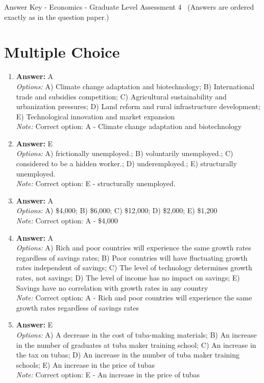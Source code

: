 \documentclass[12pt]{article}
\begin{document}
\begin{center}
Answer Key - Economics - Graduate Level Assessment 4 \
\small (Answers are ordered exactly as in the question paper.)
\end{center}

\section*{Multiple Choice}
\begin{enumerate}[label=\arabic*.]
\item \textbf{Answer:} A
\\ \textit{Options:} A) Climate change adaptation and biotechnology; B) International trade and subsidies competition; C) Agricultural sustainability and urbanization pressures; D) Land reform and rural infrastructure development; E) Technological innovation and market expansion
\\ \textit{Note:} Correct option: A - Climate change adaptation and biotechnology
\item \textbf{Answer:} E
\\ \textit{Options:} A) frictionally unemployed.; B) voluntarily unemployed.; C) considered to be a hidden worker.; D) underemployed.; E) structurally unemployed.
\\ \textit{Note:} Correct option: E - structurally unemployed.
\item \textbf{Answer:} A
\\ \textit{Options:} A) \$4,000; B) \$6,000; C) \$12,000; D) \$2,000; E) \$1,200
\\ \textit{Note:} Correct option: A - \$4,000
\item \textbf{Answer:} A
\\ \textit{Options:} A) Rich and poor countries will experience the same growth rates regardless of savings rates; B) Poor countries will have fluctuating growth rates independent of savings; C) The level of technology determines growth rates, not savings; D) The level of income has no impact on savings; E) Savings have no correlation with growth rates in any country
\\ \textit{Note:} Correct option: A - Rich and poor countries will experience the same growth rates regardless of savings rates
\item \textbf{Answer:} E
\\ \textit{Options:} A) A decrease in the cost of tuba-making materials; B) An increase in the number of graduates at tuba maker training school; C) An increase in the tax on tubas; D) An increase in the number of tuba maker training schools; E) An increase in the price of tubas
\\ \textit{Note:} Correct option: E - An increase in the price of tubas
\end{enumerate}
\end{document}
